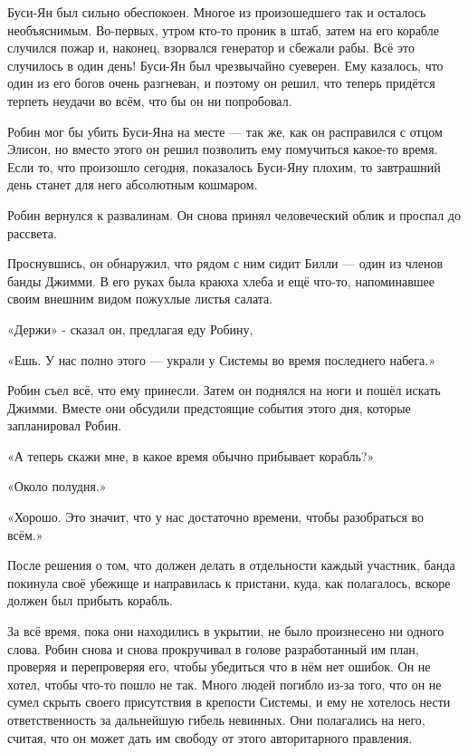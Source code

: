 \documentclass[a4paper,12pt]{book}
\begin{document}
\par
Буси-Ян был сильно обеспокоен. Многое из произошедшего так и осталось необъяснимым. Во-первых, утром кто-то проник в штаб, затем на его корабле случился пожар и, наконец, взорвался генератор и сбежали рабы. Всё это случилось в один день! Буси-Ян был чрезвычайно суеверен. Ему казалось, что один из его богов очень разгневан, и поэтому он решил, что теперь придётся терпеть неудачи во всём, что бы он ни попробовал.
\par
Робин мог бы убить Буси-Яна на месте — так же, как он расправился с отцом Элисон, но вместо этого он решил позволить ему помучиться какое-то время. Если то, что произошло сегодня, показалось Буси-Яну плохим, то завтрашний день станет для него абсолютным кошмаром.\\
\par
Робин вернулся к развалинам. Он снова принял человеческий облик и проспал до рассвета.
\par
Проснувшись, он обнаружил, что рядом с ним сидит Билли — один из членов банды Джимми. В его руках была краюха хлеба и ещё что-то, напоминавшее своим внешним видом пожухлые листья салата.
\par
«Держи» - сказал он, предлагая еду Робину,
\par
«Ешь. У нас полно этого — украли у Системы во время последнего набега.»
\par
Робин съел всё, что ему принесли. Затем он поднялся на ноги и пошёл искать Джимми. Вместе они обсудили предстоящие события этого дня, которые запланировал Робин.
\par
«А теперь скажи мне, в какое время обычно прибывает корабль?»
\par
«Около полудня.»
\par
«Хорошо. Это значит, что у нас достаточно времени, чтобы разобраться во всём.»\\
\par
После решения о том, что должен делать в отдельности каждый участник, банда покинула своё убежище и направилась к пристани, куда, как полагалось, вскоре должен был прибыть корабль.
\par
За всё время, пока они находились в укрытии, не было произнесено ни одного слова. Робин снова и снова прокручивал в голове разработанный им план, проверяя и перепроверяя его, чтобы убедиться что в нём нет ошибок. Он не хотел, чтобы что-то пошло не так. Много людей погибло из-за того, что он не сумел скрыть своего присутствия в крепости Системы, и ему не хотелось нести ответственность за дальнейшую гибель невинных. Они полагались на него, считая, что он может дать им свободу от этого авторитарного правления.
\end{document}
